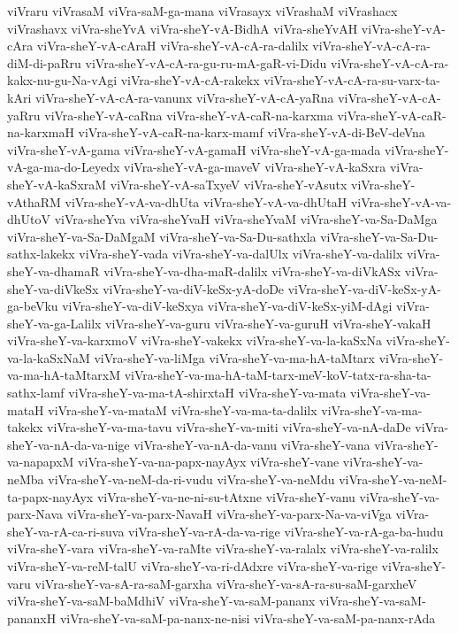 {viVraru
viVrasaM
viVra-saM-ga-mana
viVrasayx
viVrashaM
viVrashacx
viVrashavx
viVra-sheYvA
viVra-sheY-vA-BidhA
viVra-sheYvAH
viVra-sheY-vA-cAra
viVra-sheY-vA-cAraH
viVra-sheY-vA-cA-ra-dalilx
viVra-sheY-vA-cA-ra-diM-di-paRru
viVra-sheY-vA-cA-ra-gu-ru-mA-gaR-vi-Didu
viVra-sheY-vA-cA-ra-kakx-nu-gu-Na-vAgi
viVra-sheY-vA-cA-rakekx
viVra-sheY-vA-cA-ra-su-varx-ta-kAri
viVra-sheY-vA-cA-ra-vanunx
viVra-sheY-vA-cA-yaRna
viVra-sheY-vA-cA-yaRru
viVra-sheY-vA-caRna
viVra-sheY-vA-caR-na-karxma
viVra-sheY-vA-caR-na-karxmaH
viVra-sheY-vA-caR-na-karx-mamf
viVra-sheY-vA-di-BeV-deVna
viVra-sheY-vA-gama
viVra-sheY-vA-gamaH
viVra-sheY-vA-ga-mada
viVra-sheY-vA-ga-ma-do-Leyedx
viVra-sheY-vA-ga-maveV
viVra-sheY-vA-kaSxra
viVra-sheY-vA-kaSxraM
viVra-sheY-vA-saTxyeV
viVra-sheY-vAsutx
viVra-sheY-vAthaRM
viVra-sheY-vA-va-dhUta
viVra-sheY-vA-va-dhUtaH
viVra-sheY-vA-va-dhUtoV
viVra-sheYva
viVra-sheYvaH
viVra-sheYvaM
viVra-sheY-va-Sa-DaMga
viVra-sheY-va-Sa-DaMgaM
viVra-sheY-va-Sa-Du-sathxla
viVra-sheY-va-Sa-Du-sathx-lakekx
viVra-sheY-vada
viVra-sheY-va-dalUlx
viVra-sheY-va-dalilx
viVra-sheY-va-dhamaR
viVra-sheY-va-dha-maR-dalilx
viVra-sheY-va-diVkASx
viVra-sheY-va-diVkeSx
viVra-sheY-va-diV-keSx-yA-doDe
viVra-sheY-va-diV-keSx-yA-ga-beVku
viVra-sheY-va-diV-keSxya
viVra-sheY-va-diV-keSx-yiM-dAgi
viVra-sheY-va-ga-Lalilx
viVra-sheY-va-guru
viVra-sheY-va-guruH
viVra-sheY-vakaH
viVra-sheY-va-karxmoV
viVra-sheY-vakekx
viVra-sheY-va-la-kaSxNa
viVra-sheY-va-la-kaSxNaM
viVra-sheY-va-liMga
viVra-sheY-va-ma-hA-taMtarx
viVra-sheY-va-ma-hA-taMtarxM
viVra-sheY-va-ma-hA-taM-tarx-meV-koV-tatx-ra-sha-ta-sathx-lamf
viVra-sheY-va-ma-tA-shirxtaH
viVra-sheY-va-mata
viVra-sheY-va-mataH
viVra-sheY-va-mataM
viVra-sheY-va-ma-ta-dalilx
viVra-sheY-va-ma-takekx
viVra-sheY-va-ma-tavu
viVra-sheY-va-miti
viVra-sheY-va-nA-daDe
viVra-sheY-va-nA-da-va-nige
viVra-sheY-va-nA-da-vanu
viVra-sheY-vana
viVra-sheY-va-napapxM
viVra-sheY-va-na-papx-nayAyx
viVra-sheY-vane
viVra-sheY-va-neMba
viVra-sheY-va-neM-da-ri-vudu
viVra-sheY-va-neMdu
viVra-sheY-va-neM-ta-papx-nayAyx
viVra-sheY-va-ne-ni-su-tAtxne
viVra-sheY-vanu
viVra-sheY-va-parx-Nava
viVra-sheY-va-parx-NavaH
viVra-sheY-va-parx-Na-va-viVga
viVra-sheY-va-rA-ca-ri-suva
viVra-sheY-va-rA-da-va-rige
viVra-sheY-va-rA-ga-ba-hudu
viVra-sheY-vara
viVra-sheY-va-raMte
viVra-sheY-va-ralalx
viVra-sheY-va-ralilx
viVra-sheY-va-reM-talU
viVra-sheY-va-ri-dAdxre
viVra-sheY-va-rige
viVra-sheY-varu
viVra-sheY-va-sA-ra-saM-garxha
viVra-sheY-va-sA-ra-su-saM-garxheV
viVra-sheY-va-saM-baMdhiV
viVra-sheY-va-saM-pananx
viVra-sheY-va-saM-pananxH
viVra-sheY-va-saM-pa-nanx-ne-nisi
viVra-sheY-va-saM-pa-nanx-rAda
}
